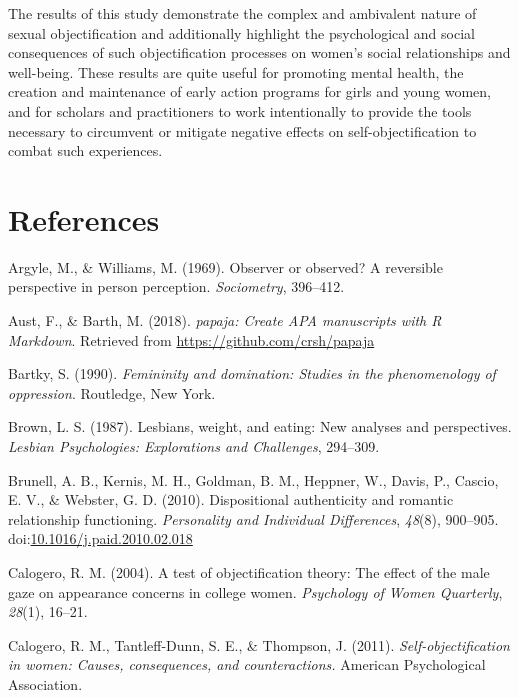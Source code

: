 \documentclass[man]{apa6}
\begin{document}
The results of this study demonstrate the complex and ambivalent nature
of sexual objectification and additionally highlight the psychological
and social consequences of such objectification processes on women's
social relationships and well-being. These results are quite useful for
promoting mental health, the creation and maintenance of early action
programs for girls and young women, and for scholars and practitioners
to work intentionally to provide the tools necessary to circumvent or
mitigate negative effects on self-objectification to combat such
experiences.

\newpage

\section{References}\label{references}

\begingroup
\setlength{\parindent}{-0.5in} \setlength{\leftskip}{0.5in}

\hypertarget{refs}{}
\hypertarget{ref-argyle1969}{}
Argyle, M., \& Williams, M. (1969). Observer or observed? A reversible
perspective in person perception. \emph{Sociometry}, 396--412.

\hypertarget{ref-R-papaja}{}
Aust, F., \& Barth, M. (2018). \emph{papaja: Create APA manuscripts with
R Markdown}. Retrieved from \url{https://github.com/crsh/papaja}

\hypertarget{ref-Bartky}{}
Bartky, S. (1990). \emph{Femininity and domination: Studies in the
phenomenology of oppression}. Routledge, New York.

\hypertarget{ref-brown1987lesbians}{}
Brown, L. S. (1987). Lesbians, weight, and eating: New analyses and
perspectives. \emph{Lesbian Psychologies: Explorations and Challenges},
294--309.

\hypertarget{ref-brunelletal2010}{}
Brunell, A. B., Kernis, M. H., Goldman, B. M., Heppner, W., Davis, P.,
Cascio, E. V., \& Webster, G. D. (2010). Dispositional authenticity and
romantic relationship functioning. \emph{Personality and Individual
Differences}, \emph{48}(8), 900--905.
doi:\href{https://doi.org/10.1016/j.paid.2010.02.018}{10.1016/j.paid.2010.02.018}

\hypertarget{ref-calogero2004test}{}
Calogero, R. M. (2004). A test of objectification theory: The effect of
the male gaze on appearance concerns in college women. \emph{Psychology
of Women Quarterly}, \emph{28}(1), 16--21.

\hypertarget{ref-calogero2011}{}
Calogero, R. M., Tantleff-Dunn, S. E., \& Thompson, J. (2011).
\emph{Self-objectification in women: Causes, consequences, and
counteractions.} American Psychological Association.
\end{document}
